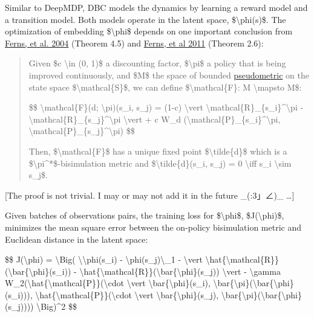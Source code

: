 Similar to DeepMDP, DBC models the dynamics by learning a reward model and a transition model. Both models operate in the latent space, \$\textbackslash phi(s)\$. The optimization of embedding \$\textbackslash phi\$ depends on one important conclusion from \href{https://arxiv.org/abs/1207.4114}{Ferns, et al. 2004} (Theorem 4.5) and \href{http://citeseerx.ist.psu.edu/viewdoc/download?doi=10.1.1.295.2114&rep=rep1&type=pdf}{Ferns, et al 2011} (Theorem 2.6):

\begin{quote}
Given \$c \textbackslash in (0, 1)\$ a discounting factor, \$\textbackslash pi\$ a policy that is being improved continuously, and \$M\$ the space of bounded \href{https://mathworld.wolfram.com/Pseudometric.html}{pseudometric} on the state space \$\textbackslash mathcal\{S\}\$, we can define \$\textbackslash mathcal\{F\}: M \textbackslash mapsto M\$:

\$\$ \textbackslash mathcal\{F\}(d; \textbackslash pi)(s\_i, s\_j) = (1-c) \textbackslash vert \textbackslash mathcal\{R\}\_\{s\_i\}\^{}\textbackslash pi - \textbackslash mathcal\{R\}\_\{s\_j\}\^{}\textbackslash pi \textbackslash vert + c W\_d (\textbackslash mathcal\{P\}\_\{s\_i\}\^{}\textbackslash pi, \textbackslash mathcal\{P\}\_\{s\_j\}\^{}\textbackslash pi) \$\$

Then, \$\textbackslash mathcal\{F\}\$ has a unique fixed point \$\textbackslash tilde\{d\}\$ which is a \$\textbackslash pi\^{}*\$-bisimulation metric and \$\textbackslash tilde\{d\}(s\_i, s\_j) = 0 \textbackslash iff s\_i \textbackslash sim s\_j\$.
\end{quote}

{[}The proof is not trivial. I may or may not add it in the future \_(:3」∠)\_ \ldots{]}

Given batches of observations pairs, the training loss for \$\textbackslash phi\$, \$J(\textbackslash phi)\$, minimizes the mean square error between the on-policy bisimulation metric and Euclidean distance in the latent space:

\$\$ J(\textbackslash phi) = \textbackslash Big( \textbackslash\textbar\textbackslash phi(s\_i) - \textbackslash phi(s\_j)\textbackslash\textbar\_1 - \textbackslash vert \textbackslash hat\{\textbackslash mathcal\{R\}\}(\textbackslash bar\{\textbackslash phi\}(s\_i)) - \textbackslash hat\{\textbackslash mathcal\{R\}\}(\textbackslash bar\{\textbackslash phi\}(s\_j)) \textbackslash vert - \textbackslash gamma W\_2(\textbackslash hat\{\textbackslash mathcal\{P\}\}(\textbackslash cdot \textbackslash vert \textbackslash bar\{\textbackslash phi\}(s\_i), \textbackslash bar\{\textbackslash pi\}(\textbackslash bar\{\textbackslash phi\}(s\_i))), \textbackslash hat\{\textbackslash mathcal\{P\}\}(\textbackslash cdot \textbackslash vert \textbackslash bar\{\textbackslash phi\}(s\_j), \textbackslash bar\{\textbackslash pi\}(\textbackslash bar\{\textbackslash phi\}(s\_j)))) \textbackslash Big)\^{}2 \$\$

